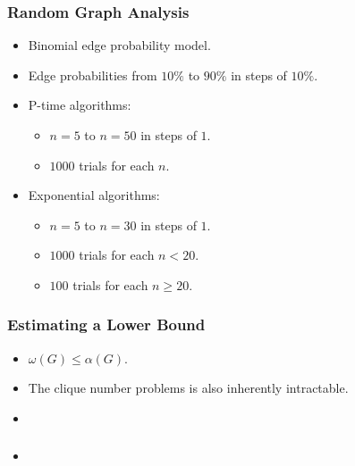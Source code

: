 \documentclass{beamer}
\renewcommand{\a}{\alpha}
\newcommand{\w}{\omega}
\begin{document}
\begin{frame}
  \frametitle{Random Graph Analysis}
  \begin{itemize}
  \item Binomial edge probability model.
  \item Edge probabilities from \(10\%\) to \(90\%\) in steps of \(10\%\).
  \item P-time algorithms:
    \begin{itemize}
    \item \(n=5\) to \(n=50\) in steps of \(1\).
    \item \(1000\) trials for each \(n\).
    \end{itemize}
  \item Exponential algorithms:
    \begin{itemize}
    \item \(n=5\) to \(n=30\) in steps of \(1\).
    \item \(1000\) trials for each \(n<20\).
    \item \(100\) trials for each \(n\ge20\).
    \end{itemize}
  \end{itemize}
\end{frame}

\begin{frame}
  \frametitle{Estimating a Lower Bound}
  \begin{itemize}
  \item \(\w(G)\le\a(G)\).
  \item The clique number problems is also inherently intractable.
    \item 
  \end{itemize}
\end{frame}

\begin{frame}
  \frametitle{}
  \begin{itemize}
  \item
  \end{itemize}
\end{frame}
\end{document}
